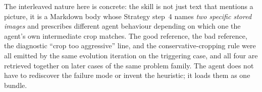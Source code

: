 The interleaved nature here is concrete: the skill is not just text that mentions a
picture, it is a Markdown body whose Strategy step~4 names \emph{two specific stored
images} and prescribes different agent behaviour depending on which one the agent's own
intermediate crop matches. The good reference, the bad reference, the diagnostic
``crop too aggressive'' line, and the conservative-cropping rule were all emitted by
the same evolution iteration on the triggering case, and all four are retrieved together
on later cases of the same problem family. The agent does not have to rediscover the
failure mode or invent the heuristic; it loads them as one bundle.


